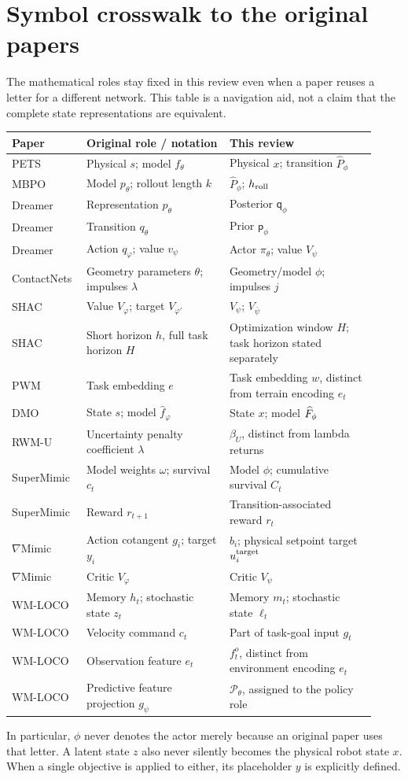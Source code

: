 \section{Symbol crosswalk to the original papers}\label{app:crosswalk}
The mathematical roles stay fixed in this review even when a paper reuses a
letter for a different network. This table is a navigation aid, not a claim that
the complete state representations are equivalent.
\begin{longtable}{@{}L{0.17\linewidth}L{0.37\linewidth}L{0.38\linewidth}@{}}
\toprule Paper & Original role / notation & This review\\\midrule\endhead
PETS & Physical $s$; model $f_\theta$ & Physical $x$; transition $\widehat P_\phi$\\
MBPO & Model $p_\theta$; rollout length $k$ & $\widehat P_\phi$; $h_{\rm roll}$\\
Dreamer & Representation $p_\theta$ & Posterior $\mathsf q_\phi$\\
Dreamer & Transition $q_\theta$ & Prior $\mathsf p_\phi$\\
Dreamer & Action $q_\varphi$; value $v_\psi$ & Actor $\pi_\theta$; value $V_\psi$\\
ContactNets & Geometry parameters $\theta$; impulses $\lambda$ & Geometry/model $\phi$; impulses $j$\\
SHAC & Value $V_\varphi$; target $V_{\varphi'}$ & $V_\psi$; $V_{\bar\psi}$\\
SHAC & Short horizon $h$, full task horizon $H$ & Optimization window $H$; task horizon stated separately\\
PWM & Task embedding $e$ & Task embedding $w$, distinct from terrain encoding $e_t$\\
DMO & State $s$; model $\hat f_\varphi$ & State $x$; model $\widehat F_\phi$\\
RWM-U & Uncertainty penalty coefficient $\lambda$ & $\beta_U$, distinct from lambda returns\\
SuperMimic & Model weights $\omega$; survival $c_t$ & Model $\phi$; cumulative survival $C_t$\\
SuperMimic & Reward $r_{t+1}$ & Transition-associated reward $r_t$\\
$\nabla$Mimic & Action cotangent $g_i$; target $y_i$ & $b_i$; physical setpoint target $u_i^{\rm target}$\\
$\nabla$Mimic & Critic $V_\varphi$ & Critic $V_\psi$\\
WM-LOCO & Memory $h_t$; stochastic state $z_t$ & Memory $m_t$; stochastic state $\ell_t$\\
WM-LOCO & Velocity command $c_t$ & Part of task-goal input $g_t$\\
WM-LOCO & Observation feature $e_t$ & $f_t^o$, distinct from environment encoding $e_t$\\
WM-LOCO & Predictive feature projection $g_\psi$ & $\mathcal P_\theta$, assigned to the policy role\\
\bottomrule
\end{longtable}
In particular, $\phi$ never denotes the actor merely because an original paper
uses that letter. A latent state $z$ also never silently becomes the physical
robot state $x$. When a single objective is applied to either, its placeholder
$y$ is explicitly defined.

